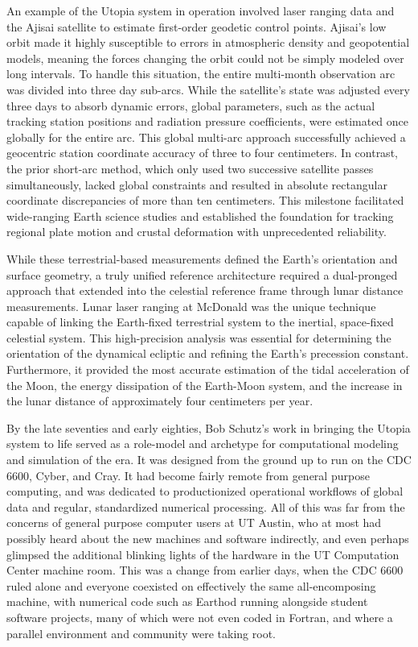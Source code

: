 An example of the Utopia system in operation involved laser ranging data and the Ajisai satellite to estimate first-order geodetic control points. Ajisai’s low orbit made it highly susceptible to errors in atmospheric density and geopotential models, meaning the forces changing the orbit could not be simply modeled over long intervals. To handle this situation, the entire multi-month observation arc was divided into three day sub-arcs. While the satellite's state was adjusted every three days to absorb dynamic errors, global parameters, such as the actual tracking station positions and radiation pressure coefficients, were estimated once globally for the entire arc. This global multi-arc approach successfully achieved a geocentric station coordinate accuracy of three to four centimeters. In contrast, the prior short-arc method, which only used two successive satellite passes simultaneously, lacked global constraints and resulted in absolute rectangular coordinate discrepancies of more than ten centimeters. This milestone facilitated wide-ranging Earth science studies and established the foundation for tracking regional plate motion and crustal deformation with unprecedented reliability. 

While these terrestrial-based measurements defined the Earth’s orientation and surface geometry, a truly unified reference architecture required a dual-pronged approach that extended into the celestial reference frame through lunar distance measurements. Lunar laser ranging at McDonald was the unique technique capable of linking the Earth-fixed terrestrial system to the inertial, space-fixed celestial system. This high-precision analysis was essential for determining the orientation of the dynamical ecliptic and refining the Earth’s precession constant. Furthermore, it provided the most accurate estimation of the tidal acceleration of the Moon, the energy dissipation of the Earth-Moon system, and the increase in the lunar distance of approximately four centimeters per year.

By the late seventies and early eighties, Bob Schutz’s work in bringing the Utopia system to life served as a role-model and archetype for computational modeling and simulation of the era. It was designed from the ground up to run on the CDC 6600, Cyber, and Cray. It had become fairly remote from general purpose computing, and was dedicated to productionized operational workflows of global data and regular, standardized numerical processing. All of this was far from the concerns of general purpose computer users at UT Austin, who at most had possibly heard about the new machines and software indirectly, and even perhaps glimpsed the additional blinking lights of the hardware in the UT Computation Center machine room. This was a change from earlier days, when the CDC 6600 ruled alone and everyone coexisted on effectively the same all-encomposing machine, with numerical code such as Earthod running alongside student software projects, many of which were not even coded in Fortran, and where a parallel environment and community were taking root. 
